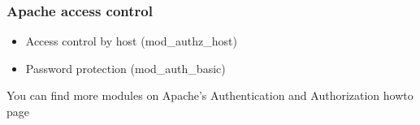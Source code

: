 \begin{frame}[fragile]
        \frametitle{Apache access control}
\begin{itemize}
    \item Access control by host (mod\_authz\_host)
    \item Password protection (mod\_auth\_basic)  
\end{itemize}
  You can find more modules on Apache's Authentication and Authorization howto page
\end{frame}
